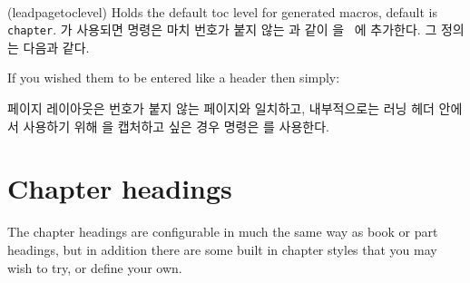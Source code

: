 \begin{syntax}
\cmd{\leadpagetoclevel} \\
\end{syntax}
\glossary(leadpagetoclevel)%
{}%
{Holds the default toc level for  generated macros,
default is \texttt{chapter}.}
가 사용되면 명령은 마치 번호가 붙지 않는
\cmd{\leadpagetoclevel}과 같이 을 \toc\ 에 추가한다. 그 정의는 다음과
같다.
\begin{lcode}
\newcommand*{\leadpagetoclevel}{chapter}
\end{lcode}
If you wished them to be entered like a \cmd{\part} header then simply:
\begin{lcode}
\renewcommand*{\leadpagetoclevel}{part}
\end{lcode}


페이지 레이아웃은 번호가 붙지 않는 \cmd{\part} 페이지와 일치하고, 내부적으로는
러닝 헤더 안에서 사용하기 위해 을 캡처하고 싶은 경우 명령은
\cmd{\partmark}를 사용한다.



\section{Chapter headings}
\label{sec:chapter-headings}

    The chapter headings are configurable in much the same way as book or part
headings, but in addition there are some built in chapter styles that you may
wish to try, or define your own.

